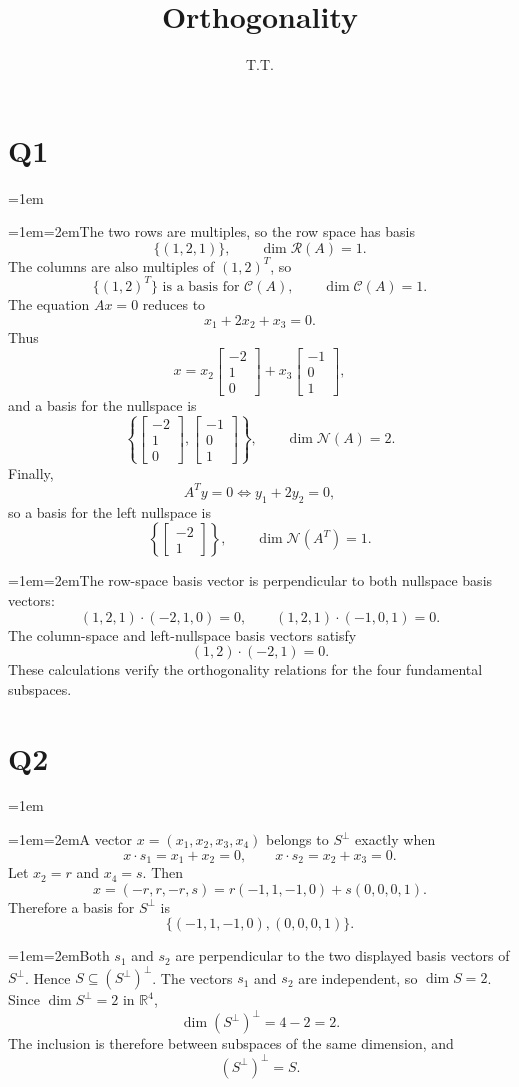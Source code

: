\documentclass[11pt]{article}
\title{Orthogonality}\author{T.T.}\date{}
\newcommand{\solutionquestion}[1]{\par\leftskip=0pt\section*{Q#1}\leftskip=1em}
\newcommand{\solutionpart}[1]{\par\smallskip\leftskip=1em\noindent\hangindent=2em\hangafter=1\makebox[1.5em][l]{\textbf{(#1)}}\hspace{0.5em}\ignorespaces}
\begin{document}
\maketitle

\solutionquestion{1}
\solutionpart{i}The two rows are multiples, so the row space has basis
\[
\{(1,2,1)\},\qquad \dim\mathcal R(A)=1.
\]
The columns are also multiples of ${(1,2)}^{T}$, so
\[
\{ {(1,2)}^{T} \}\text{ is a basis for }\mathcal C(A),\qquad \dim\mathcal C(A)=1.
\]
The equation $Ax=0$ reduces to
\[
x_1+2x_2+x_3=0.
\]
Thus
\[
x=x_2\begin{bmatrix}-2\\1\\0\end{bmatrix}
+x_3\begin{bmatrix}-1\\0\\1\end{bmatrix},
\]
and a basis for the nullspace is
\[
\left\{\begin{bmatrix}-2\\1\\0\end{bmatrix},
\begin{bmatrix}-1\\0\\1\end{bmatrix}\right\},
\qquad \dim\mathcal N(A)=2.
\]
Finally,
\[
{A}^{T}y=0\Longleftrightarrow y_1+2y_2=0,
\]
so a basis for the left nullspace is
\[
\left\{\begin{bmatrix}-2\\1\end{bmatrix}\right\},
\qquad \dim\mathcal N({A}^{T})=1.
\]

\solutionpart{ii}The row-space basis vector is perpendicular to both nullspace basis vectors:
\[
(1,2,1)\cdot(-2,1,0)=0,
\qquad
(1,2,1)\cdot(-1,0,1)=0.
\]
The column-space and left-nullspace basis vectors satisfy
\[
(1,2)\cdot(-2,1)=0.
\]
These calculations verify the orthogonality relations for the four fundamental subspaces.

\solutionquestion{2}
\solutionpart{i}A vector $x=(x_1,x_2,x_3,x_4)$ belongs to $S^\perp$ exactly when
\[
x\cdot s_1=x_1+x_2=0,
\qquad
x\cdot s_2=x_2+x_3=0.
\]
Let $x_2=r$ and $x_4=s$. Then
\[
x=(-r,r,-r,s)
=r(-1,1,-1,0)+s(0,0,0,1).
\]
Therefore a basis for $S^\perp$ is
\[
\{(-1,1,-1,0),(0,0,0,1)\}.
\]

\solutionpart{ii}Both $s_1$ and $s_2$ are perpendicular to the two displayed basis vectors of $S^\perp$. Hence $S\subseteq{(S^\perp)}^\perp$. The vectors $s_1$ and $s_2$ are independent, so $\dim S=2$. Since $\dim S^\perp=2$ in $\mathbb R^4$,
\[
\dim{(S^\perp)}^\perp=4-2=2.
\]
The inclusion is therefore between subspaces of the same dimension, and
\[
{(S^\perp)}^\perp=S.
\]
\end{document}
